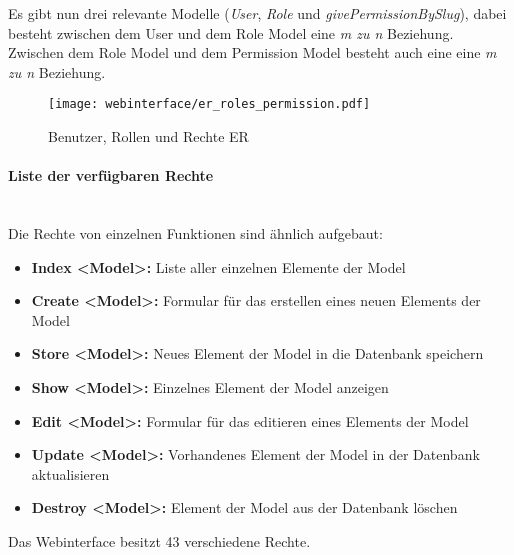 Es gibt nun drei relevante Modelle (\textit{User}, \textit{Role} und \textit{givePermissionBySlug}), dabei
besteht zwischen dem User und dem Role Model eine \textit{m zu n} Beziehung. Zwischen dem
Role Model und dem Permission Model besteht auch eine eine \textit{m zu n} Beziehung.

\begin{figure}[H]
  \centering
  \texttt{[image: webinterface/er\_roles\_permission.pdf]}
  \caption{Benutzer, Rollen und Rechte ER}
\end{figure}

\paragraph{Liste der verfügbaren Rechte}\mbox{}\\

Die Rechte von einzelnen Funktionen sind ähnlich aufgebaut:

\begin{itemize}
  \item \textbf{Index <Model>:} Liste aller einzelnen Elemente der Model
  \item \textbf{Create <Model>:} Formular für das erstellen eines neuen
  Elements der Model
  \item \textbf{Store <Model>:} Neues Element der Model in die Datenbank speichern
  \item \textbf{Show <Model>:} Einzelnes Element der Model anzeigen
  \item \textbf{Edit <Model>:} Formular für das editieren eines Elements der
  Model
  \item \textbf{Update <Model>:} Vorhandenes Element der Model in der
  Datenbank aktualisieren
  \item \textbf{Destroy <Model>:} Element der Model aus der Datenbank löschen
\end{itemize}

Das Webinterface besitzt 43 verschiedene Rechte.


